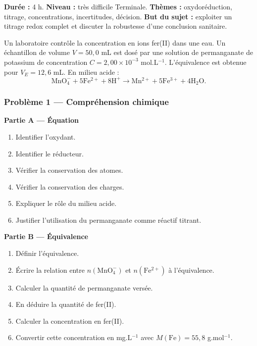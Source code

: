 \documentclass[11pt,a4paper]{article}
\begin{document}
\hypertarget{PC-EXCELLENCE-02}{}
\begin{difficile}
\textbf{Durée :} 4 h.  
\textbf{Niveau :} très difficile Terminale.  
\textbf{Thèmes :} oxydoréduction, titrage, concentrations, incertitudes, décision.  
\textbf{But du sujet :} exploiter un titrage redox complet et discuter la robustesse d'une conclusion sanitaire.

\medskip

Un laboratoire contrôle la concentration en ions fer(II) dans une eau. Un échantillon de volume $V=50{,}0$ mL est dosé par une solution de permanganate de potassium de concentration $C=2{,}00\times10^{-3}$ mol.L$^{-1}$. L'équivalence est obtenue pour $V_E=12{,}6$ mL. En milieu acide :
\[
\mathrm{MnO_4^-+5Fe^{2+}+8H^+\rightarrow Mn^{2+}+5Fe^{3+}+4H_2O}.
\]

\subsubsection*{Problème 1 — Compréhension chimique}

\textbf{Partie A — Équation}
\begin{enumerate}
  \item Identifier l'oxydant.
  \item Identifier le réducteur.
  \item Vérifier la conservation des atomes.
  \item Vérifier la conservation des charges.
  \item Expliquer le rôle du milieu acide.
  \item Justifier l'utilisation du permanganate comme réactif titrant.
\end{enumerate}

\textbf{Partie B — Équivalence}
\begin{enumerate}
  \item Définir l'équivalence.
  \item Écrire la relation entre $n(\mathrm{MnO_4^-})$ et $n(\mathrm{Fe^{2+}})$ à l'équivalence.
  \item Calculer la quantité de permanganate versée.
  \item En déduire la quantité de fer(II).
  \item Calculer la concentration en fer(II).
  \item Convertir cette concentration en mg.L$^{-1}$ avec $M(\mathrm{Fe})=55{,}8$ g.mol$^{-1}$.
\end{enumerate}


\end{difficile}
\end{document}

